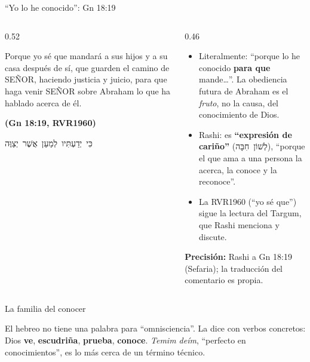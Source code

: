 \documentclass[hyperref={bookmarks=false},aspectratio=169]{beamer}
\newcommand{\heb}[1]{\mbox{\foreignlanguage{hebrew}{#1}}}
\newcommand{\SENOR}{S{\fontsize{0.78em}{1em}\selectfont EÑOR}}
\newcommand{\fuente}[1]{\par\hfill{\upshape\bfseries\footnotesize\textcolor{azul}{#1}}}
\newcommand{\destacar}[1]{\textbf{\textcolor{azul}{#1}}}
\newcommand{\precision}[1]{{\footnotesize\color{gris}\textbf{Precisión:} #1}}
\begin{document}
\begin{frame}{``Yo lo he conocido'': Gn 18:19}
\begin{columns}[t,onlytextwidth]
\begin{column}{0.52\textwidth}
\begin{cita}Porque yo sé que mandará a sus hijos y a su casa después de sí, que guarden el camino de \SENOR{}, haciendo justicia y juicio, para que haga venir \SENOR{} sobre Abraham lo que ha hablado acerca de él.\fuente{(Gn 18:19, RVR1960)}\end{cita}
\begin{center}\heb{כִּי יְדַעְתִּיו לְמַעַן אֲשֶׁר יְצַוֶּה}\end{center}
\end{column}
\begin{column}{0.46\textwidth}\small
\begin{itemize}
\item Literalmente: ``porque lo he conocido \destacar{para que} mande\ldots''. La obediencia futura de Abraham es el \emph{fruto}, no la causa, del conocimiento de Dios.
\item Rashi: es \destacar{``expresión de cariño''} (\heb{לְשׁוֹן חִבָּה}), ``porque el que ama a una persona la acerca, la conoce y la reconoce''.
\item La RVR1960 (``yo sé que'') sigue la lectura del Targum, que Rashi menciona y discute.
\end{itemize}
\precision{Rashi a Gn 18:19 (Sefaria); la traducción del comentario es propia.}
\end{column}
\end{columns}
\end{frame}

\begin{frame}{La familia del conocer}
\centering
{}\par\medskip
\small\RaggedRight El hebreo no tiene una palabra para ``omnisciencia''. La dice con verbos concretos: Dios \destacar{ve}, \destacar{escudriña}, \destacar{prueba}, \destacar{conoce}. \emph{Temim deím}, ``perfecto en conocimientos'', es lo más cerca de un término técnico.
\end{frame}
\end{document}
